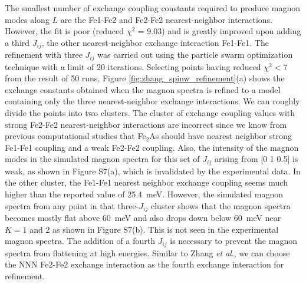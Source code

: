 \documentclass[10pt,doublespacing,edeposit]{uiucthesis2020}
\begin{document}
\begin{mainmatter}
The smallest number of exchange coupling constants required to produce magnon modes along $L$ are the Fe1-Fe2 and Fe2-Fe2 nearest-neighbor interactions. However, the fit is poor (reduced $\chi^2$ = 9.03) and is greatly improved upon adding a third $J_{ij}$, the other nearest-neighbor exchange interaction Fe1-Fe1. 
The refinement with three $J_{ij}$ was carried out using the particle swarm optimization technique with a limit of 20 iterations.
Selecting points having reduced $\chi^2 < 7$  from the result of 50 runs, Figure \ref{fig:zhang_spinw_refinement}(a) shows the exchange constants obtained when the magnon spectra is refined to a model containing only the three nearest-neighbor exchange interactions. 
We can roughly divide the points into two clusters. The cluster of exchange coupling values with strong Fe2-Fe2 nearest-neighbor interactions are incorrect since we know from previous computational studies that Fe$_2$As should have nearest neighbor strong Fe1-Fe1 coupling and a weak Fe2-Fe2 coupling.\cite{Zhang2013} Also, the intensity of the magnon modes in the simulated magnon spectra for this set of $J_{ij}$ arising from [0 1 0.5] is weak, as shown in Figure S7(a),\cite{supplement} which is invalidated by the experimental data. In the other cluster, the Fe1-Fe1 nearest neighbor exchange coupling seems much higher than the reported value of 25.4~meV. However, the simulated magnon spectra from any point in that three-$J_{ij}$ cluster shows that the magnon spectra becomes mostly flat above 60~meV and also drops down below 60~meV near $K = 1$ and 2 as shown in Figure S7(b).\cite{supplement} This is not seen in the experimental magnon spectra. The addition of a fourth $J_{ij}$ is necessary to prevent the magnon spectra from flattening at high energies. Similar to Zhang \emph{et al}.,\cite{Zhang2013} we can choose the NNN Fe2-Fe2 exchange interaction as the fourth exchange interaction for refinement.



\end{mainmatter}
\end{document}
